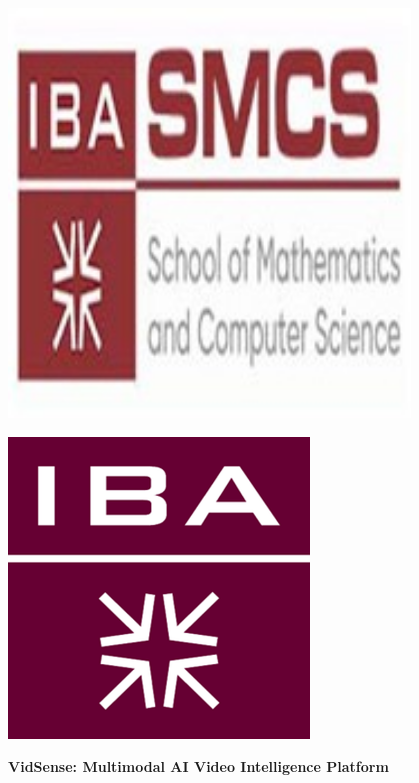 \documentclass{bscs}
\begin{document}
\begin{titlepage}
\centering

\vspace*{2cm}
\begin{minipage}{0.4\textwidth}
\centering
\includegraphics[width=0.8\textwidth]{iba_left.jpg}
\end{minipage}
\hfill
\begin{minipage}{0.4\textwidth}
\centering
\includegraphics[width=0.6\textwidth]{iba_right.png}
\end{minipage}

\vspace{3cm}

{\Large \textbf{VidSense: Multimodal AI Video Intelligence Platform}}


\end{titlepage}
\end{document}
